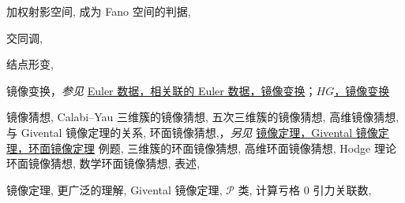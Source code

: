 \begin{theindex}
\indexspace
\item \leavevmode\hypertarget{idx:1432}{加权射影空间},\enspace{}
\subitem \leavevmode\hypertarget{idx:1433}{成为 Fano 空间的判据},\enspace{}
\indexspace
\item \leavevmode\hypertarget{idx:0638}{交同调},\enspace{}
\indexspace
\item \leavevmode\hypertarget{idx:0940}{结点形变},\enspace{}
\indexspace
\item \leavevmode\hypertarget{idx:0868}{镜像变换}，\textit{参见} \hyperlink{idx:0268}{Euler 数据，相关联的 Euler 数据，镜像变换}；\hyperlink{idx:0581}{$HG$，镜像变换}
\indexspace
\item \leavevmode\hypertarget{source:485}{}\hypertarget{idx:0786}{镜像猜想},\enspace{}
\subitem \leavevmode\hypertarget{idx:0787}{Calabi--Yau 三维簇的镜像猜想},\enspace{}
\subitem \leavevmode\hypertarget{idx:0788}{五次三维簇的镜像猜想},\enspace{}
\subitem \leavevmode\hypertarget{idx:0789}{高维镜像猜想},\enspace{}
\subitem \leavevmode\hypertarget{idx:0790}{与 Givental 镜像定理的关系},\enspace{}
\subitem \leavevmode\hypertarget{idx:0791}{环面镜像猜想},\enspace{}，\textit{另见} \hyperlink{idx:0862}{镜像定理，Givental 镜像定理，环面镜像定理}
\subsubitem \leavevmode\hypertarget{idx:0792}{例题},\enspace{}
\subsubitem \leavevmode\hypertarget{idx:0793}{三维簇的环面镜像猜想},\enspace{}
\subsubitem \leavevmode\hypertarget{idx:0794}{高维环面镜像猜想},\enspace{}
\subsubitem \leavevmode\hypertarget{idx:0795}{Hodge 理论环面镜像猜想},\enspace{}
\subsubitem \leavevmode\hypertarget{idx:0796}{数学环面镜像猜想},\enspace{}
\subsubitem \leavevmode\hypertarget{idx:0797}{表述},\enspace{}
\indexspace
\item \leavevmode\hypertarget{idx:0844}{镜像定理},\enspace{}
\subitem \leavevmode\hypertarget{idx:0845}{更广泛的理解},\enspace{}
\subitem \leavevmode\hypertarget{idx:0846}{Givental 镜像定理},\enspace{}
\subsubitem \leavevmode\hypertarget{idx:0847}{$\mathcal P$ 类},\enspace{}
\subsubitem \leavevmode\hypertarget{idx:0848}{计算亏格 $0$ 引力关联数},\enspace{}

\end{theindex}
